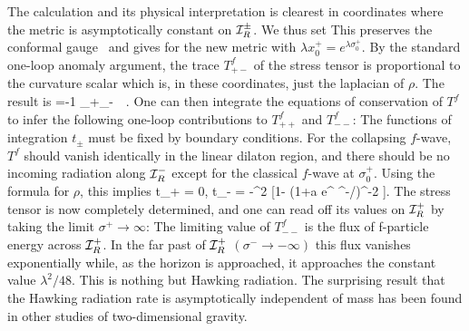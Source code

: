 The calculation and its physical interpretation is clearest in coordinates
where the metric is asymptotically constant on ${\cal I}_R^{\pm}$.
We thus set
%
\eqn\eighteen
{}
%
This preserves the conformal gauge \two\ and gives for the new
metric
%
\eqn{}
%
with $\lambda x_0^+ = e^{\lambda \sigma_0^+}$.
By the standard one-loop anomaly argument,
the trace $T^f_{+-}$ of the stress tensor is
proportional to the curvature scalar which is, in these coordinates, just the
laplacian of $\rho$. The result is
%
\eqn\fourteen
%
{ =-{1 } \partial_+\partial_-\rho~~.}
One can then integrate the equations of conservation of $T^f$
to infer the following one-loop contributions to $T_{++}^f$ and $T_{--}^f$:
%
\eqn\fifteen
{}
%
The functions of integration $t_\pm$ must be fixed by boundary conditions.
For the collapsing
$f$-wave, $T^f$ should vanish identically in the linear dilaton region, and
there should be no incoming radiation along ${\cal I}^-_R$ except for the
classical $f$-wave at $\sigma^+_0$.  Using the formula for $\rho$, this
implies
%
\eqn\sixteen
{t_+ = 0, \qquad t_- = {-\lambda^2 } [1- (1+a e^{\lambda
\sigma^-}/\lambda )^{-2} ]. }
%
The stress tensor is now completely determined, and one can read off
its values on ${\cal I}^+_R$ by taking the limit $\sigma^+\to \infty$:
%
\eqn\nineteen
{}
%
The limiting value of $T^f_{--}$ is the flux of f-particle energy across
${\cal I}^+_R$. In the far past of ${\cal I}^+_R$ $(\sigma^- \to-\infty)$ this
flux vanishes exponentially while, as the horizon is approached, it
approaches the constant value $\lambda^2/48$.
This is nothing but Hawking radiation. The surprising result
that the Hawking radiation rate is asymptotically
independent of mass has been found in
other studies of two-dimensional gravity.

